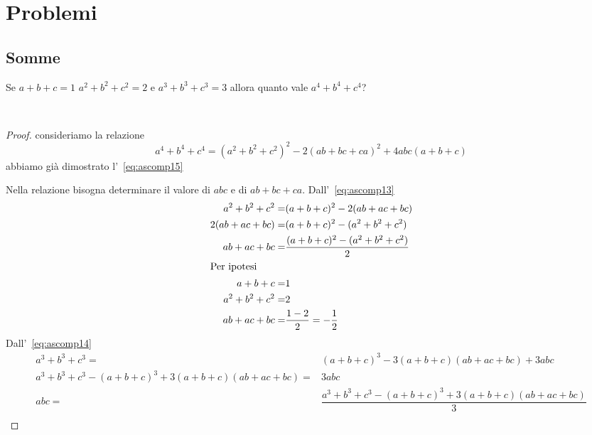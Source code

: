 \chapter{Problemi}
\section{Somme}
\begin{prob}
Se $a+b+c=1$ $a^2+b^2+c^2=2$ e $a^3+b^3+c^3=3$ allora quanto vale $a^4+b^4+c^4$?
\end{prob}~\cite{Gregorio2021}
\begin{proof}
consideriamo la relazione \[a^4+b^4+c^4=(a^2+b^2+c^2)^2-2(ab+bc+ca)^2+4abc(a+b+c)\] abbiamo già dimostrato l'~\vref{eq:ascomp15}

Nella relazione bisogna determinare il valore di $abc$ e di $ab+bc+ca$.
Dall'~\vref{eq:ascomp13}
\begin{align*}
a^2+b^2+c^2=&(a+b+c)^2-2(ab+ac+bc)\\
2(ab+ac+bc)=&(a+b+c)^2-(a^2+b^2+c^2)\\
ab+ac+bc=&\dfrac{(a+b+c)^2-(a^2+b^2+c^2)}{2}\\
\intertext{Per ipotesi}
a+b+c=&1\\
a^2+b^2+c^2=&2\\
ab+ac+bc=&\dfrac{1-2}{2}=-\dfrac{1}{2}\\
\end{align*}
Dall'~\vref{eq:ascomp14}
\begin{align*}
	a^3+b^3+c^3=&{}(a+b+c)^3-3(a+b+c)(ab+ac+bc)+3abc\\
	a^3+b^3+c^3-(a+b+c)^3+3(a+b+c)(ab+ac+bc)=&3abc\\
	abc=&	\dfrac{a^3+b^3+c^3-(a+b+c)^3+3(a+b+c)(ab+ac+bc)}{3}\\
\end{align*}
\end{proof}